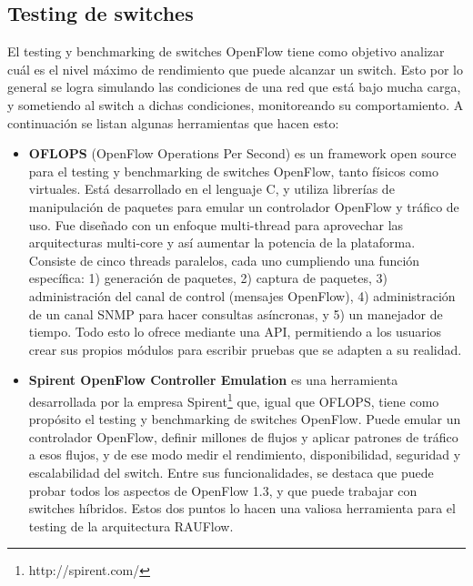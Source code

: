 \subsection{Testing de switches}
El testing y benchmarking de switches OpenFlow tiene como objetivo analizar cuál es el nivel máximo de rendimiento que puede alcanzar un switch. Esto por lo general se logra simulando las condiciones de una red que está bajo mucha carga, y sometiendo al switch a dichas condiciones, monitoreando su comportamiento. A continuación se listan algunas herramientas que hacen esto:
\begin{itemize}
	\item \textbf{OFLOPS} \cite{oflops} (OpenFlow Operations Per Second) es un framework open source para el testing y benchmarking de switches OpenFlow, tanto físicos como virtuales. Está desarrollado en el lenguaje C, y utiliza librerías de manipulación de paquetes para emular un controlador OpenFlow y tráfico de uso. Fue diseñado con un enfoque multi-thread para aprovechar las arquitecturas multi-core y así aumentar la potencia de la plataforma. Consiste de cinco threads paralelos, cada uno cumpliendo una función específica: 1) generación de paquetes, 2) captura de paquetes, 3) administración del canal de control (mensajes OpenFlow), 4) administración de un canal SNMP para hacer consultas asíncronas, y 5) un manejador de tiempo. Todo esto lo ofrece mediante una API, permitiendo a los usuarios crear sus propios módulos para escribir pruebas que se adapten a su realidad.
	\item \textbf{Spirent OpenFlow Controller Emulation} \cite{spirent-controller-emulation} es una herramienta desarrollada por la empresa Spirent\footnote{http://spirent.com/} que, igual que OFLOPS, tiene como propósito el testing y benchmarking de switches OpenFlow. Puede emular un controlador OpenFlow, definir millones de flujos y aplicar patrones de tráfico a esos flujos, y de ese modo medir el rendimiento, disponibilidad, seguridad y escalabilidad del switch. Entre sus funcionalidades, se destaca que puede probar todos los aspectos de OpenFlow 1.3, y que puede trabajar con switches híbridos. Estos dos puntos lo hacen una valiosa herramienta para el testing de la arquitectura RAUFlow.
\end{itemize}

